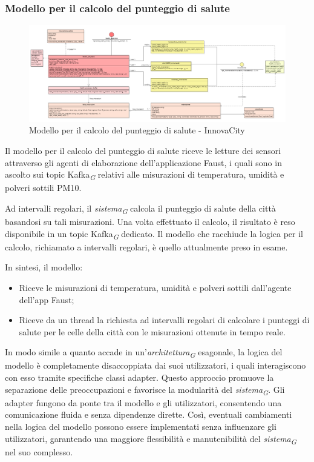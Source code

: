 \subsubsection{Modello per il calcolo del punteggio di salute}
\begin{figure}[H]
    \centering
    \includegraphics[width=1\textwidth]{../Images/SpecificaTecnica/healthModel.PNG}
    \caption{Modello per il calcolo del punteggio di salute - InnovaCity}
    \label{fig: healthModello}
\end{figure}

Il modello per il calcolo del punteggio di salute riceve le letture dei sensori attraverso gli agenti di elaborazione dell'applicazione Faust, i quali sono in ascolto sui topic Kafka\textsubscript{\textit{G}} relativi alle misurazioni di temperatura, umidità e polveri sottili PM10.

Ad intervalli regolari, il \textit{sistema}\textsubscript{\textit{G}} calcola il punteggio di salute della città basandosi su tali misurazioni. Una volta effettuato il calcolo, il risultato è reso disponibile in un topic Kafka\textsubscript{\textit{G}} dedicato.
Il modello che racchiude la logica per il calcolo, richiamato a intervalli regolari, è quello attualmente preso in esame.

In sintesi, il modello:
\begin{itemize}
    \item Riceve le misurazioni di temperatura, umidità e polveri sottili dall'agente dell'app Faust;
    \item Riceve da un thread la richiesta ad intervalli regolari di calcolare i punteggi di salute per le celle della città con le misurazioni ottenute in tempo reale.
\end{itemize}

In modo simile a quanto accade in un'\textit{architettura}\textsubscript{\textit{G}} esagonale, la logica del modello è completamente disaccoppiata dai suoi utilizzatori, i quali interagiscono con esso tramite specifiche classi adapter. Questo approccio promuove la separazione delle preoccupazioni e favorisce la modularità del \textit{sistema}\textsubscript{\textit{G}}. Gli adapter fungono da ponte tra il modello e gli utilizzatori, consentendo una comunicazione fluida e senza dipendenze dirette. Così, eventuali cambiamenti nella logica del modello possono essere implementati senza influenzare gli utilizzatori, garantendo una maggiore flessibilità e manutenibilità del \textit{sistema}\textsubscript{\textit{G}} nel suo complesso.

